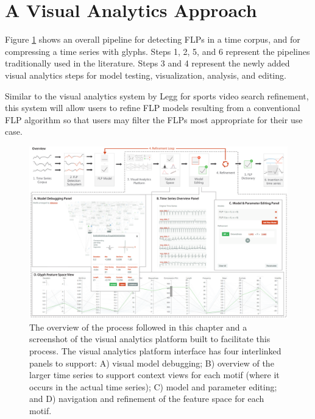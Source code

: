 \section{A Visual Analytics Approach}
\label{sec:va-approach}

Figure \ref{fig:analytics_environment} shows an overall pipeline for detecting FLPs in a time corpus, and for compressing a time series with glyphs.
Steps 1, 2, 5, and 6 represent the pipelines traditionally used in the literature.
Steps 3 and 4 represent the newly added visual analytics steps for model testing, visualization, analysis, and editing.

Similar to the visual analytics system by Legg \etal \cite{legg13} for sports video search refinement, this system will allow users to refine FLP models resulting from a conventional FLP algorithm so that users may filter the FLPs most appropriate for their use case. 

\begin{figure}[ht!]
\centering
\includegraphics[width=\textwidth]{images/timeseries/application}
\caption{The overview of the process followed in this chapter and a screenshot of the visual analytics platform built to facilitate this process.
The visual analytics platform interface has four interlinked panels to support:
A) visual model debugging;
B) overview of the larger time series to support context views for each motif (where it occurs in the actual time series);
C) model and parameter editing; and
D) navigation and refinement of the feature space for each motif.}
\label{fig:analytics_environment}
\vspace{-10pt}
\end{figure}

